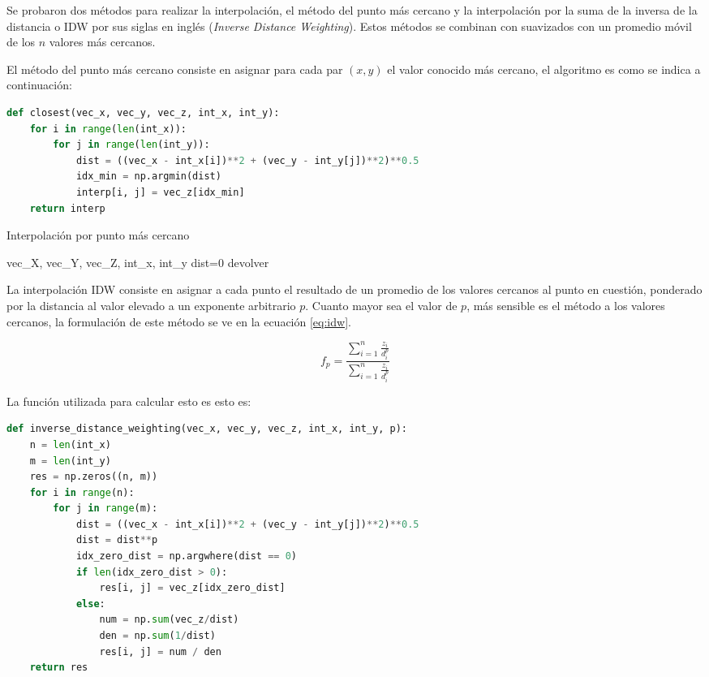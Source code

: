 Se probaron dos métodos para realizar la interpolación, el método del punto
más cercano y la interpolación por la suma de la inversa de la distancia o 
IDW por sus siglas en inglés (\emph{Inverse Distance Weighting}).
%
Estos métodos se combinan con suavizados con un promedio móvil de los $n$
valores más cercanos.

El método del punto más cercano consiste en asignar para cada par $(x, y)$
el valor conocido más cercano, el algoritmo es como se indica a continuación:

\begin{lstlisting}[language=python, title={(Python) Interpolación por punto más Cercano}, label={algo:mas_cercano}]
def closest(vec_x, vec_y, vec_z, int_x, int_y):
    for i in range(len(int_x)):
        for j in range(len(int_y)):
            dist = ((vec_x - int_x[i])**2 + (vec_y - int_y[j])**2)**0.5
            idx_min = np.argmin(dist)
            interp[i, j] = vec_z[idx_min]
    return interp
\end{lstlisting}

\begin{algorithm}
 \caption{Interpolación por punto más cercano}
 \label{algo:genetico}
     \SetAlgoLined
     vec_X, vec_Y, vec_Z, int_x, int_y \;
     dist=0\;
     devolver
\end{algorithm}

La interpolación IDW consiste en asignar a cada punto el resultado de un promedio
de los valores cercanos al punto en cuestión, ponderado por la distancia al valor
elevado a un exponente arbitrario $p$.
%
Cuanto mayor sea el valor de $p$, más sensible es el método a los valores cercanos,
la formulación de este método se ve en la ecuación \ref{eq:idw}.

\begin{equation}
    f_p = \frac{\sum_{i=1}^{n} \frac{z_i}{d_i^p}} {\sum_{i=1}^{n} \frac{z_i}{d_i^p}}
    \label{eq:idw}
\end{equation}

La función utilizada para calcular esto es esto es:

\begin{lstlisting}[language=python, title={(Python) Interpolación por IDW}, label={algo:idw}]
def inverse_distance_weighting(vec_x, vec_y, vec_z, int_x, int_y, p):
    n = len(int_x)
    m = len(int_y)
    res = np.zeros((n, m))
    for i in range(n):
        for j in range(m):
            dist = ((vec_x - int_x[i])**2 + (vec_y - int_y[j])**2)**0.5
            dist = dist**p
            idx_zero_dist = np.argwhere(dist == 0)
            if len(idx_zero_dist > 0):
                res[i, j] = vec_z[idx_zero_dist]
            else:
                num = np.sum(vec_z/dist)
                den = np.sum(1/dist)
                res[i, j] = num / den
    return res
\end{lstlisting}

